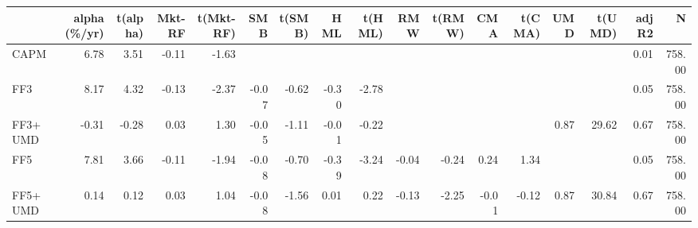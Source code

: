 \begin{tabular}{lrrrrrrrrrrrrrrrr}
\toprule
 & alpha (\%/yr) & t(alpha) & Mkt-RF & t(Mkt-RF) & SMB & t(SMB) & HML & t(HML) & RMW & t(RMW) & CMA & t(CMA) & UMD & t(UMD) & adj R2 & N \\
\midrule
CAPM & 6.78 & 3.51 & -0.11 & -1.63 &  &  &  &  &  &  &  &  &  &  & 0.01 & 758.00 \\
FF3 & 8.17 & 4.32 & -0.13 & -2.37 & -0.07 & -0.62 & -0.30 & -2.78 &  &  &  &  &  &  & 0.05 & 758.00 \\
FF3+UMD & -0.31 & -0.28 & 0.03 & 1.30 & -0.05 & -1.11 & -0.01 & -0.22 &  &  &  &  & 0.87 & 29.62 & 0.67 & 758.00 \\
FF5 & 7.81 & 3.66 & -0.11 & -1.94 & -0.08 & -0.70 & -0.39 & -3.24 & -0.04 & -0.24 & 0.24 & 1.34 &  &  & 0.05 & 758.00 \\
FF5+UMD & 0.14 & 0.12 & 0.03 & 1.04 & -0.08 & -1.56 & 0.01 & 0.22 & -0.13 & -2.25 & -0.01 & -0.12 & 0.87 & 30.84 & 0.67 & 758.00 \\
\bottomrule
\end{tabular}
